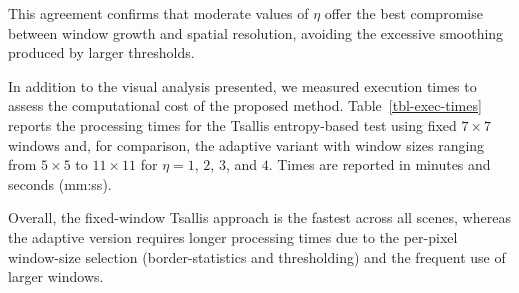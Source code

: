 \documentclass[
  lettersize  journal,
]{IEEEtran}%
\begin{document}
This agreement confirms that moderate values of \(\eta\) offer the best
compromise between window growth and spatial resolution, avoiding the
excessive smoothing produced by larger thresholds.

In addition to the visual analysis presented, we measured execution
times to assess the computational cost of the proposed method.
Table~\ref{tbl-exec-times} reports the processing times for the Tsallis
entropy-based test using fixed \(7\times7\) windows and, for comparison,
the adaptive variant with window sizes ranging from \(5\times5\) to
\(11\times11\) for \(\eta=1\), \(2\), \(3\), and \(4\). Times are
reported in minutes and seconds (mm:ss).

\renewcommand{\arraystretch}{1.4}

\begin{table}[hbt]

\caption{\label{tbl-exec-times}Execution times for heterogeneity
detection using fixed and adaptive windows}


\end{table}%

Overall, the fixed-window Tsallis approach is the fastest across all
scenes, whereas the adaptive version requires longer processing times
due to the per-pixel window-size selection (border-statistics and
thresholding) and the frequent use of larger windows.
\end{document}
